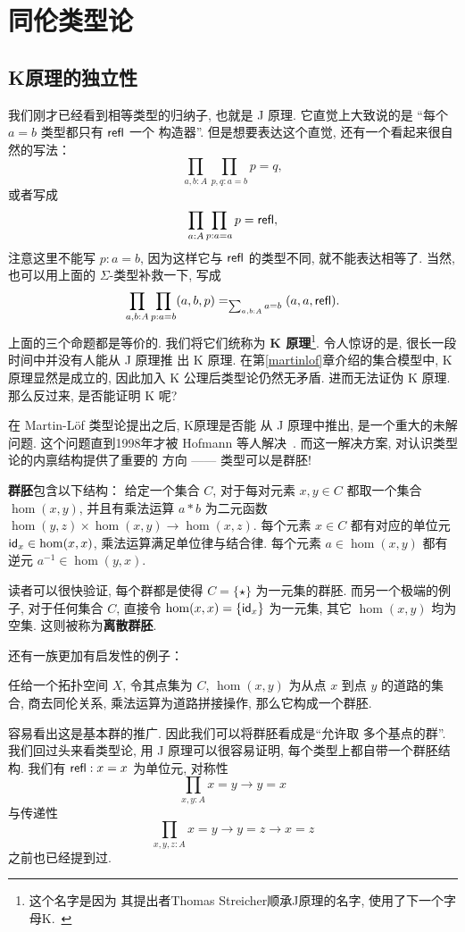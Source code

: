\chapter{同伦类型论}
\section{K原理的独立性}
我们刚才已经看到相等类型的归纳子, 也就是 J 原理. 它直觉上大致说的是
“每个 \(a = b\) 类型都只有 \(\textsf{refl}\) 一个
构造器”. 但是想要表达这个直觉, 还有一个看起来很自然的写法：
\[\prod_{a,b : A} \prod_{p,q : a = b} p = q,\]
或者写成
\[\prod_{a : A} \prod_{p : a = a} p = \textsf{refl},\]
注意这里不能写 \(p : a = b\), 因为这样它与
\(\textsf{refl}\) 的类型不同, 就不能表达相等了.
当然, 也可以用上面的 \(\Sigma\)-类型补救一下, 写成
\[\prod_{a,b : A} \prod_{p: a = b} (a,b,p) =_{\sum_{a,b : A}a = b} (a,a,\textsf{refl}).\]
上面的三个命题都是等价的. 我们将它们统称为
\textbf{K 原理}\footnote{这个名字是因为
其提出者Thomas Streicher顺承J原理的名字, 使用了下一个字母K.~\cite{streicher:1993:K}}.
令人惊讶的是, 很长一段时间中并没有人能从 J 原理推
出 K 原理. 在第\ref{martinlof}章介绍的集合模型中,
K 原理显然是成立的, 因此加入 K 公理后类型论仍然无矛盾.
进而无法证伪 K 原理. 那么反过来, 是否能证明 K 呢?

在 Martin-L\"of 类型论提出之后, K原理是否能
从 J 原理中推出, 是一个重大的未解问题.
这个问题直到1998年才被 Hofmann 等人解决~\cite{hofmann:1998:groupoid}.
而这一解决方案, 对认识类型论的内禀结构提供了重要的
方向 ------ 类型可以是群胚!

\begin{definition}
\textbf{群胚}包含以下结构：
给定一个集合 \(C\), 对于每对元素 \(x,y\in C\)
都取一个集合 \(\hom(x,y)\), 并且有乘法运算
\(a * b\) 为二元函数 \(\hom(y,z) \times \hom(x,y) \to \hom(x,z)\).
每个元素 \(x \in C\) 都有对应的单位元
\(\textsf{id}_x \in \hom(x,x)\), 乘法运算满足单位律与结合律.
每个元素 \(a \in \hom(x,y)\) 都有逆元
\(a^{-1} \in \hom(y,x)\).
\end{definition}
读者可以很快验证, 每个群都是使得 \(C = \{\star\}\)
为一元集的群胚. 而另一个极端的例子, 对于任何集合 \(C\),
直接令 \(\hom(x,x) = \{\textsf{id}_x\}\) 为一元集, 其它 \(\hom(x,y)\)
均为空集. 这则被称为\textbf{离散群胚}.

还有一族更加有启发性的例子：
\begin{example}
任给一个拓扑空间 \(X\), 令其点集为
\(C\), \(\hom(x,y)\) 为从点 \(x\) 到点
\(y\) 的道路的集合, 商去同伦关系,
乘法运算为道路拼接操作, 那么它构成一个群胚.
\end{example}
容易看出这是基本群的推广. 因此我们可以将群胚看成是“允许取
多个基点的群”. 我们回过头来看类型论,
用 J 原理可以很容易证明, 每个类型上都自带一个群胚结构.
我们有 \(\textsf{refl} : x = x\) 为单位元,
对称性
\[\prod_{x, y : A} x = y \to y = x\]
与传递性
\[\prod_{x,y,z : A} x = y \to y = z \to x = z\]
之前也已经提到过.

